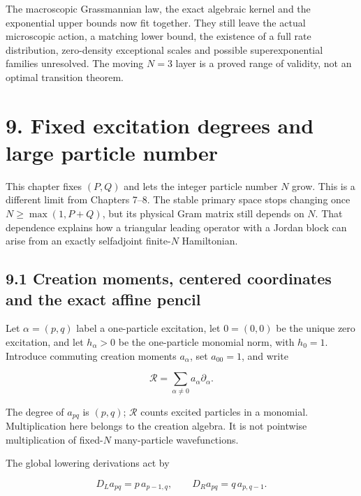 The macroscopic Grassmannian law, the exact algebraic kernel and the exponential upper bounds now fit together. They still leave the actual microscopic action, a matching lower bound, the existence of a full rate distribution, zero-density exceptional scales and possible superexponential families unresolved. The moving \(N=3\) layer is a proved range of validity, not an optimal transition theorem.

\clearpage
\hypertarget{fixed-excitation-degrees-and-large-particle-number}{%
\section{9. Fixed excitation degrees and large particle number}\label{fixed-excitation-degrees-and-large-particle-number}}

This chapter fixes \((P,Q)\) and lets the integer particle number \(N\) grow. This is a different limit from Chapters 7--8. The stable primary space stops changing once \(N\geq\max(1,P+Q)\), but its physical Gram matrix still depends on \(N\). That dependence explains how a triangular leading operator with a Jordan block can arise from an exactly selfadjoint finite-\(N\) Hamiltonian.

\hypertarget{creation-moments-centered-coordinates-and-the-exact-affine-pencil}{%
\subsection{9.1 Creation moments, centered coordinates and the exact affine pencil}\label{creation-moments-centered-coordinates-and-the-exact-affine-pencil}}

Let \(\alpha=(p,q)\) label a one-particle excitation, let \(0=(0,0)\) be the unique zero excitation, and let \(h_\alpha>0\) be the one-particle monomial norm, with \(h_0=1\). Introduce commuting creation moments \(a_\alpha\), set \(a_{00}=1\), and write

\[
\mathcal R=\sum_{\alpha\ne0}a_\alpha\partial_\alpha.
\]

The degree of \(a_{pq}\) is \((p,q)\); \(\mathcal R\) counts excited particles in a monomial. Multiplication here belongs to the creation algebra. It is not pointwise multiplication of fixed-\(N\) many-particle wavefunctions.

The global lowering derivations act by

\[
D_La_{pq}=p\,a_{p-1,q},\qquad D_Ra_{pq}=q\,a_{p,q-1}.
\]

